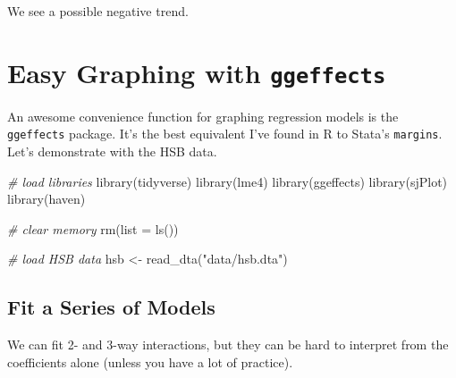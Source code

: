 \documentclass[
  letterpaper,
  DIV=11,
  numbers=noendperiod]{scrreprt}
\newenvironment{Shaded}{\begin{snugshade}}{\end{snugshade}}
\newcommand{\AttributeTok}[1]{\textcolor[rgb]{0.49,0.56,0.16}{#1}}
\newcommand{\CommentTok}[1]{\textcolor[rgb]{0.38,0.63,0.69}{\textit{#1}}}
\newcommand{\FunctionTok}[1]{\textcolor[rgb]{0.02,0.16,0.49}{#1}}
\newcommand{\NormalTok}[1]{\textcolor[rgb]{0.00,0.44,0.13}{#1}}
\newcommand{\OtherTok}[1]{\textcolor[rgb]{0.00,0.44,0.13}{#1}}
\newcommand{\StringTok}[1]{\textcolor[rgb]{0.25,0.44,0.63}{#1}}
\begin{document}
We see a possible negative trend.

\hypertarget{easy-graphing-with-ggeffects}{%
\chapter{\texorpdfstring{Easy Graphing with
\texttt{ggeffects}}{Easy Graphing with ggeffects}}\label{easy-graphing-with-ggeffects}}

An awesome convenience function for graphing regression models is the
\texttt{ggeffects} package. It's the best equivalent I've found in R to
Stata's \texttt{margins}. Let's demonstrate with the HSB data.

\begin{Shaded}
\begin{Highlighting}[]
\CommentTok{\# load libraries}
\FunctionTok{library}\NormalTok{(tidyverse)}
\FunctionTok{library}\NormalTok{(lme4)}
\FunctionTok{library}\NormalTok{(ggeffects)}
\FunctionTok{library}\NormalTok{(sjPlot)}
\FunctionTok{library}\NormalTok{(haven)}

\CommentTok{\# clear memory}
\FunctionTok{rm}\NormalTok{(}\AttributeTok{list =} \FunctionTok{ls}\NormalTok{())}

\CommentTok{\# load HSB data}
\NormalTok{hsb }\OtherTok{\textless{}{-}} \FunctionTok{read\_dta}\NormalTok{(}\StringTok{"data/hsb.dta"}\NormalTok{)}
\end{Highlighting}
\end{Shaded}

\hypertarget{fit-a-series-of-models}{%
\section{Fit a Series of Models}\label{fit-a-series-of-models}}

We can fit 2- and 3-way interactions, but they can be hard to interpret
from the coefficients alone (unless you have a lot of practice).
\end{document}
